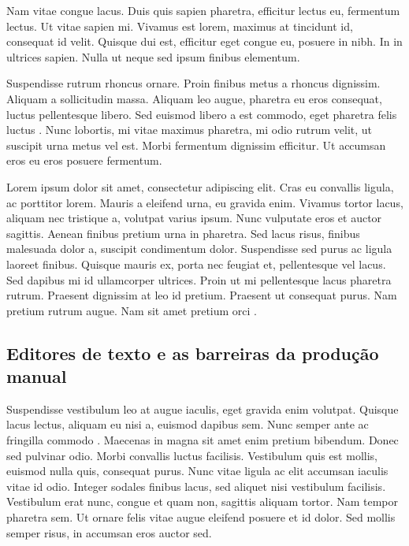 \documentclass[12pt,a4paper]{article}
\begin{document}
Nam vitae congue lacus. Duis quis sapien pharetra, efficitur lectus eu, fermentum lectus. Ut vitae sapien mi. Vivamus est lorem, maximus at tincidunt id, consequat id velit. Quisque dui est, efficitur eget congue eu, posuere in nibh. In in ultrices sapien. Nulla ut neque sed ipsum finibus elementum.

Suspendisse rutrum rhoncus ornare. Proin finibus metus a rhoncus dignissim. Aliquam a sollicitudin massa. Aliquam leo augue, pharetra eu eros consequat, luctus pellentesque libero. Sed euismod libero a est commodo, eget pharetra felis luctus  \cite{nbr14724_2024}.  Nunc lobortis, mi vitae maximus pharetra, mi odio rutrum velit, ut suscipit urna metus vel est. Morbi fermentum dignissim efficitur. Ut accumsan eros eu eros posuere fermentum.

Lorem ipsum dolor sit amet, consectetur adipiscing elit. Cras eu convallis ligula, ac porttitor lorem. Mauris a eleifend urna, eu gravida enim. Vivamus tortor lacus, aliquam nec tristique a, volutpat varius ipsum. Nunc vulputate eros et auctor sagittis. Aenean finibus pretium urna in pharetra. Sed lacus risus, finibus malesuada dolor a, suscipit condimentum dolor. Suspendisse sed purus ac ligula laoreet finibus. Quisque mauris ex, porta nec feugiat et, pellentesque vel lacus. Sed dapibus mi id ullamcorper ultrices. Proin ut mi pellentesque lacus pharetra rutrum. Praesent dignissim at leo id pretium. Praesent ut consequat purus. Nam pretium rutrum augue. Nam sit amet pretium orci \cite{nbr6023_2025}.


\subsection{Editores de texto e as barreiras da produção manual}

Suspendisse vestibulum leo at augue iaculis, eget gravida enim volutpat. Quisque lacus lectus, aliquam eu nisi a, euismod dapibus sem. Nunc semper ante ac fringilla commodo \cite{meyrowitz1982}. Maecenas in magna sit amet enim pretium bibendum. Donec sed pulvinar odio. Morbi convallis luctus facilisis. Vestibulum quis est mollis, euismod nulla quis, consequat purus. Nunc vitae ligula ac elit accumsan iaculis vitae id odio. Integer sodales finibus lacus, sed aliquet nisi vestibulum facilisis. Vestibulum erat nunc, congue et quam non, sagittis aliquam tortor. Nam tempor pharetra sem. Ut ornare felis vitae augue eleifend posuere et id dolor. Sed mollis semper risus, in accumsan eros auctor sed.
\end{document}
